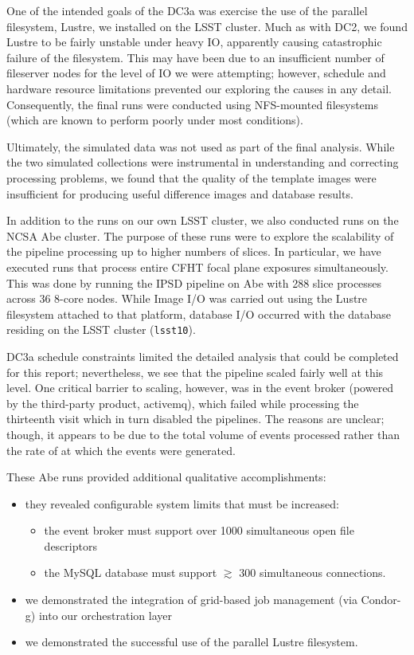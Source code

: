One of the intended goals of the DC3a was exercise the use of the
parallel filesystem, Lustre, we installed on the LSST cluster.  Much
as with DC2, we found Lustre to be fairly unstable under heavy IO,
apparently causing catastrophic failure of the filesystem.  This may
have been due to an insufficient number of fileserver nodes for the
level of IO we were attempting; however, schedule and hardware
resource limitations prevented our exploring the causes in any
detail.  Consequently, the final runs were conducted using NFS-mounted
filesystems (which are known to perform poorly under most conditions).  

Ultimately, the simulated data was not used as part of the final
analysis.  While the two simulated collections were instrumental
in understanding and correcting processing problems, we found that the
quality of the template images were insufficient for producing useful
difference images and database results.  

In addition to the runs on our own LSST cluster, we also conducted
runs on the NCSA Abe cluster.  The purpose of these runs were to
explore the scalability of the pipeline processing up to higher
numbers of slices.  In particular, we have executed runs that process
entire CFHT focal plane exposures simultaneously.  This was done by
running the IPSD pipeline on Abe with 288 slice processes across 36
8-core nodes.  While Image I/O was carried out using the Lustre
filesystem attached to that platform, database I/O occurred with the
database residing on the LSST cluster ({\tt lsst10}).  

DC3a schedule constraints limited the detailed analysis
that could be completed for this report; nevertheless, we see that the
pipeline scaled fairly well at this level.  One critical barrier to
scaling, however, was in the event broker (powered by the
third-party product, activemq), which failed while processing the
thirteenth visit which in turn disabled the pipelines.  The reasons
are unclear; though, it appears to be due to the total volume of
events processed rather than the rate of at which the events were
generated.  

These Abe runs provided additional qualitative accomplishments:

\begin{itemize}
\item they revealed configurable system limits that must be increased:
\begin{itemize}
\item the event broker must support over 1000 simultaneous open file
  descriptors 
\item the MySQL database must support $\gtrsim$ 300 simultaneous
  connections.  
\end{itemize}
\item we demonstrated the integration of grid-based job management
  (via Condor-g) into our orchestration layer
\item we demonstrated the successful use of the parallel Lustre
  filesystem.  
\end{itemize}

